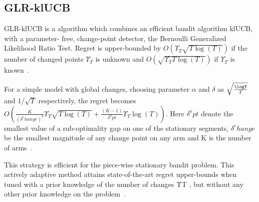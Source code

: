 \subsection{GLR-klUCB}\label{subsec:glr-klucb}
GLR-klUCB is a algorithm which combines an efficient bandit algorithm klUCB, with a parameter- free, change-point detector, the Bernoulli Generalized Likelihood Ratio Test.
Regret is upper-bounded by $ O\left(\Upsilon_T \sqrt{T \log\left(T\right)} \right)$ if the number of changed points $\Upsilon_T $ is unknown and $ O\left(\sqrt{\Upsilon_T T \log\left(T\right)} \right)$ if  $\Upsilon_T $ is known~\citep{Besson2019}.
\par
For a simple model with global changes, choosing parameter $\alpha$ and $\delta $ as $\sqrt{\frac{\logT}{T}}$ and $1/\sqrt{T}$ respectively, the regret becomes $O\left(\frac{K}{\left(\delta^change\right)^2} \Upsilon_T \sqrt{T \log\left(T\right)}+\frac{\left(K-1\right)}{\delta^opt} \Upsilon_T \log\left(T\right)\right)$.
Here $\delta^opt$ denote the smallest value of a sub-optimality gap on one of the stationary segments, $\delta^change$ be the smallest magnitude of any change point on any arm and K is the number of arms~\citep{Besson2019}.
\par
This strategy is efficient for the piece-wise stationary bandit problem.
This actively adaptive method attains state-of-the-art regret upper-bounds when tuned with a prior knowledge of the number of changes ΥT , but without any other prior knowledge on the problem~\citep{Besson2019}.